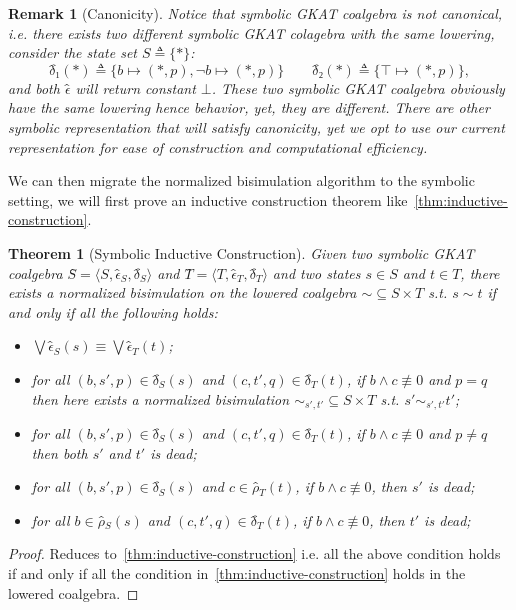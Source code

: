\documentclass{extarticle}
\newtheorem{theorem}{Theorem}
\newtheorem{remark}[definition]{Remark}
\begin{document}
\begin{remark}[Canonicity]
    Notice that symbolic GKAT coalgebra is not canonical, i.e. there exists two different symbolic GKAT colagebra with the same lowering, consider the state set \(S ≜ \{*\}\):
    \[{δ̂}₁(*) ≜ \{b ↦ (*, p), ¬ b ↦ (*, p)\} \qquad 
    {δ̂}₂(*) ≜ \{⊤ ↦ (*, p)\},\] 
    and both \(ϵ̂\) will return constant \(⊥\).
    These two symbolic GKAT coalgebra obviously have the same lowering hence behavior, yet, they are different.
    There are other symbolic representation that will satisfy canonicity, yet we opt to use our current representation for ease of construction and computational efficiency.
\end{remark}

We can then migrate the normalized bisimulation algorithm to the symbolic setting, we will first prove an inductive construction theorem like~\cref{thm:inductive-construction}.

\begin{theorem}[Symbolic Inductive Construction]\label{thm:symb-inductive-construction}
    Given two symbolic GKAT coalgebra \(Ŝ = ⟨S, ϵ̂_S, δ̂_S⟩\) and \(T̂ = ⟨T, ϵ̂_T, δ̂_T⟩\) and two states \(s ∈ S\) and \(t ∈ T\), there exists a normalized bisimulation on the lowered coalgebra \({∼} ⊆ S × T\) s.t. \(s ∼ t\) if and only if all the following holds:
    \begin{itemize}
        \item \(⋁ ϵ̂_S(s) ≡ ⋁ ϵ̂_T(t)\);
        \item for all \((b, s', p) ∈ δ̂_S(s)\) and \((c, t', q) ∈ δ̂_T(t)\), if \(b ∧ c ≢ 0\) and \(p = q\) then here exists a normalized bisimulation \({∼_{s',t'}} ⊆ S × T\) s.t. \(s' ∼_{s',t'} t'\);
        \item for all \((b, s', p) ∈ δ̂_S(s)\) and \((c, t', q) ∈ δ̂_T(t)\), if \(b ∧ c ≢ 0\) and \(p ≠ q\) then both \(s'\) and \(t'\) is dead;  
        \item for all \((b, s', p) ∈ δ̂_S(s)\) and \(c ∈ ρ̂_T(t)\), if \(b ∧ c ≢ 0\), then \(s'\) is dead;
        \item for all \(b ∈ ρ̂_S(s)\) and \((c, t', q) ∈ δ̂_T(t)\), if \(b ∧ c ≢ 0\), then \(t'\) is dead;
    \end{itemize}
\end{theorem}

\begin{proof}
    Reduces to~\cref{thm:inductive-construction} i.e. all the above condition holds if and only if all the condition in~\cref{thm:inductive-construction} holds in the lowered coalgebra.
\end{proof}
\end{document}
